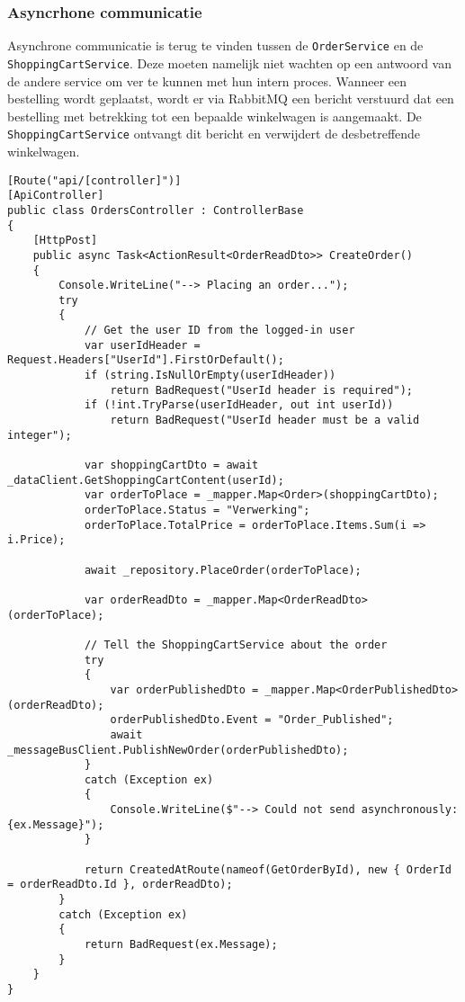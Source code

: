 \subsubsection{Asyncrhone communicatie}

Asynchrone communicatie is terug te vinden tussen de \texttt{OrderService} en de \texttt{ShoppingCartService}. Deze moeten namelijk niet wachten op een antwoord van de andere service om ver te kunnen met hun intern proces. Wanneer een bestelling wordt geplaatst, wordt er via RabbitMQ een bericht verstuurd dat een bestelling met betrekking tot een bepaalde winkelwagen is aangemaakt. De \texttt{ShoppingCartService} ontvangt dit bericht en verwijdert de desbetreffende winkelwagen.
\medskip

\begin{lstlisting}[style=mystyleA, caption=OrdersController.cs (fragment)(Microservice), label=lst:MicroOrdersC]
[Route("api/[controller]")]
[ApiController]
public class OrdersController : ControllerBase
{	
	[HttpPost]
	public async Task<ActionResult<OrderReadDto>> CreateOrder()
	{
		Console.WriteLine("--> Placing an order...");
		try
		{
			// Get the user ID from the logged-in user
			var userIdHeader = Request.Headers["UserId"].FirstOrDefault();
			if (string.IsNullOrEmpty(userIdHeader))
				return BadRequest("UserId header is required");
			if (!int.TryParse(userIdHeader, out int userId))
				return BadRequest("UserId header must be a valid integer");
			
			var shoppingCartDto = await _dataClient.GetShoppingCartContent(userId);
			var orderToPlace = _mapper.Map<Order>(shoppingCartDto);
			orderToPlace.Status = "Verwerking";
			orderToPlace.TotalPrice = orderToPlace.Items.Sum(i => i.Price);
			
			await _repository.PlaceOrder(orderToPlace);
			
			var orderReadDto = _mapper.Map<OrderReadDto>(orderToPlace);
			
			// Tell the ShoppingCartService about the order
			try
			{
				var orderPublishedDto = _mapper.Map<OrderPublishedDto>(orderReadDto);
				orderPublishedDto.Event = "Order_Published";
				await _messageBusClient.PublishNewOrder(orderPublishedDto);
			}
			catch (Exception ex)
			{
				Console.WriteLine($"--> Could not send asynchronously: {ex.Message}");
			}
			
			return CreatedAtRoute(nameof(GetOrderById), new { OrderId = orderReadDto.Id }, orderReadDto);
		}
		catch (Exception ex)
		{
			return BadRequest(ex.Message);
		}
	}
}
\end{lstlisting}

